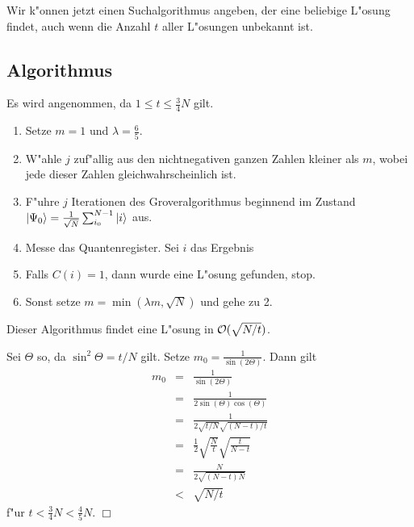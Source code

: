            Wir k"onnen jetzt einen Suchalgorithmus angeben, der eine beliebige L"osung findet, auch wenn die Anzahl $t$ aller L"osungen unbekannt ist.
           \subsection*{Algorithmus}
             Es wird angenommen, da\3 $1 \le t \le \frac{3}{4}N$ gilt. 
             \begin{enumerate} 
               \item Setze $m = 1$ und $\lambda = \frac{6}{5}$. 
               \item W"ahle $j$ zuf"allig aus den nichtnegativen ganzen Zahlen kleiner als $m$, wobei jede dieser Zahlen gleichwahrscheinlich ist. 
               \item F"uhre $j$ Iterationen des Groveralgorithmus beginnend im Zustand $\left| \Psi_0 \right> = \frac{1}{\sqrt{N}} \sum_{i_0}^{N-1} \left| i \right>$ aus.
               \item Messe das Quantenregister. Sei $i$ das Ergebnis 
               \item Falls $C(i)=1$, dann wurde eine L"osung gefunden, stop.
               \item Sonst setze $m = \min(\lambda m, \sqrt{N})$ und gehe zu 2. 
             \end{enumerate} 
           \begin{satz} 
             Dieser Algorithmus findet eine L"osung in ${\cal O}(\sqrt{N/t})$. 
           \end{satz} 
           \beweis 
              Sei $\Theta$ so, da\3 $\sin^2\Theta = t/N$ gilt. Setze $m_0 = \frac{1}{\sin(2\Theta)}$. Dann gilt 
              \begin{eqnarray*} 
                m_0 & = & \frac{1}{\sin(2\Theta)} \\ 
                    & = & \frac{1}{2\sin(\Theta)\cos(\Theta)} \\
                    & = & \frac{1}{2\sqrt{t/N}\sqrt{(N-t)/t}} \\
                    & = & \frac{1}{2}\sqrt{\frac{N}{t}}\sqrt{\frac{t}{N-t}} \\
                    & = & \frac{N}{2\sqrt{(N-t)N}} \\ 
                    & < & \sqrt{N/t}
              \end{eqnarray*} 
              f"ur $t<\frac{3}{4}N < \frac{4}{5}N$.
              \hfill $\Box$

